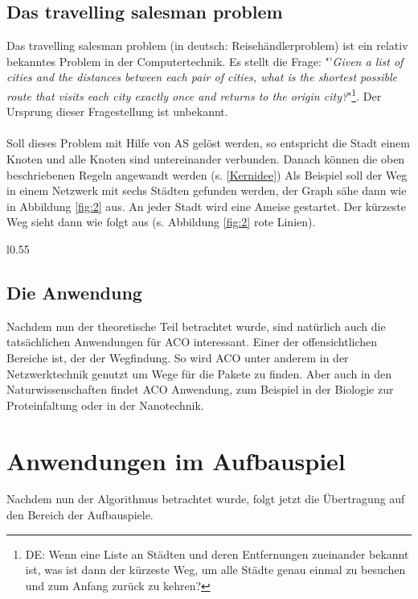 \documentclass[12pt]{article}
\begin{document}
\subsection{Das travelling salesman problem}\label{TSP}
Das travelling salesman problem (in deutsch: Reisehändlerproblem) ist ein relativ bekanntes Problem 
in der Computertechnik. Es stellt die Frage:
"'\textit{Given a list of cities and the distances between each pair of cities, what is the shortest possible route that visits each city exactly once and returns to the origin city?}"\cite{wiki_TSP}\footnote{DE: Wenn eine Liste an Städten und deren Entfernungen zueinander bekannt ist, was ist dann der kürzeste Weg, um alle Städte genau einmal zu besuchen und zum Anfang zurück zu kehren?}. Der Ursprung dieser Fragestellung ist unbekannt.\\\\
Soll dieses Problem mit Hilfe von AS gelöst werden, so entspricht die Stadt einem Knoten und alle Knoten sind untereinander verbunden. Danach können die oben beschriebenen Regeln angewandt werden (s. \ref{Kernidee})
Als Beispiel soll der Weg in einem Netzwerk mit sechs Städten gefunden werden, der Graph sähe dann wie in Abbildung \ref{fig:2} aus. An jeder Stadt wird eine Ameise gestartet. Der kürzeste Weg \cite{aco-sim} sieht dann wie folgt aus (s. Abbildung \ref{fig:2} rote Linien).
\begin{wrapfigure}[13]{l}{0.55\textwidth}
\centering
{}
\caption{Netzwerk an Städten}
\label{fig:2}
\end{wrapfigure}
\subsection{Die Anwendung}
Nachdem nun der theoretische Teil betrachtet wurde, sind natürlich auch die tatsächlichen Anwendungen für ACO interessant. Einer der offensichtlichen Bereiche ist, der der Wegfindung. So wird ACO unter anderem in der Netzwerktechnik genutzt um Wege für die Pakete zu finden. Aber auch in den Naturwissenschaften findet ACO Anwendung, zum Beispiel in der Biologie zur Proteinfaltung oder in der Nanotechnik. 
\section{Anwendungen im Aufbauspiel}
Nachdem nun der Algorithmus betrachtet wurde, folgt jetzt die Übertragung auf den Bereich der Aufbauspiele.
\end{document}
